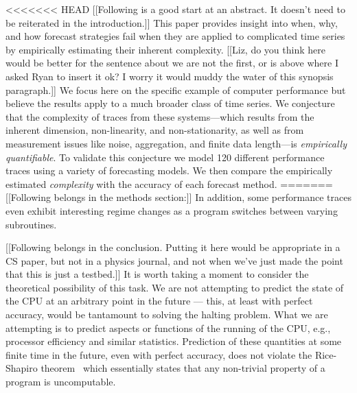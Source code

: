 <<<<<<< HEAD
[[Following is a good start at an abstract. It doesn't need to be
    reiterated in the introduction.]]  This paper provides insight
into when, why, and how forecast strategies fail when they are applied
to complicated time series by empirically estimating their inherent
complexity. [[Liz, do you think here would be better for the sentence
    about we are not the first, or is above where I asked Ryan to
    insert it ok? I worry it would muddy the water of this synopsis
    paragraph.]] We focus here on the specific example of computer
performance but believe the results apply to a much broader class of
time series. We conjecture that the complexity of traces from these
systems---which results from the inherent dimension, non-linearity,
and non-stationarity, as well as from measurement issues like noise,
aggregation, and finite data length---is \emph{empirically
  quantifiable}.  To validate this conjecture we model 120 different
performance traces using a variety of forecasting models.  We then
compare the empirically estimated \emph{complexity} with the accuracy
of each forecast method.
=======
[[Following belongs in the methods section:]] In addition, some
performance traces even exhibit interesting regime changes as a
program switches between varying subroutines. 

[[Following belongs in the conclusion.  Putting it here would be
    appropriate in a CS paper, but not in a physics journal, and not
    when we've just made the point that this is just a testbed.]] 
It is worth taking a moment to consider the theoretical possibility of
this task. We are not attempting to predict the state of the CPU at an
arbitrary point in the future --- this, at least with perfect
accuracy, would be tantamount to solving the halting problem. What we
are attempting is to predict aspects or functions of the running of
the CPU, e.g., processor efficiency and similar statistics. Prediction
of these quantities at some finite time in the future, even with
perfect accuracy, does not violate the Rice-Shapiro
theorem~\cite{hopcroft2007} which essentially states that any non-trivial
property of a program is uncomputable.

